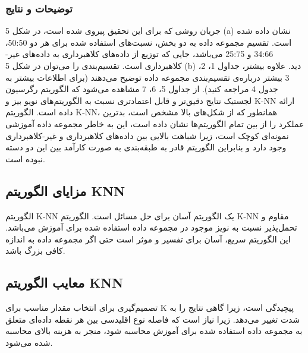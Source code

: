 \documentclass{CSICC2020}
\begin{document}
\subsubsection{توضیحات و نتایج }
جریان روشی که برای این تحقیق پیروی شده است، در شکل 5 (a) نشان داده شده است. تقسیم مجموعه داده به دو بخش، نسبت‌های استفاده شده برای هر دو 50:50، 34:66 و 25:75 می‌باشد، جایی که توزیع از داده‌های کلاهبرداری به داده‌های غیر-کلاهبرداری است. تقسیم‌بندی را می‌توان در شکل 5 (b) دید. علاوه بیشتر، جداول 1، 2، 3 بیشتر درباره‌ی تقسیم‌بندی مجموعه داده توضیح می‌دهند (برای اطلاعات بیشتر به جدول 4 مراجعه کنید). از جداول 5، 6، 7 مشاهده می‌شود که الگوریتم رگرسیون لجستیک نتایج دقیق‌تر و قابل اعتماد‌تری نسبت به الگوریتم‌های نویو بیز و K-NN ارائه داده است. الگوریتم K-NN، همانطور که از شکل‌های بالا مشخص است، بدترین عملکرد را از بین تمام الگوریتم‌ها نشان داده است، این به خاطر مجموعه داده آموزشی نمونه‌ای کوچک است، زیرا شباهت بالایی بین داده‌های کلاهبرداری و غیر-کلاهبرداری وجود دارد و بنابراین الگوریتم قادر به طبقه‌بندی به صورت کارآمد بین این دو دسته نبوده است.

\subsection{مزایای الگوریتم KNN}


 الگوریتم K-NN یک الگوریتم آسان برای حل مسائل است. 
 الگوریتم K-NN مقاوم و تحمل‌پذیر نسبت به نویز موجود در مجموعه داده استفاده شده برای آموزش می‌باشد. 
 این الگوریتم سریع، آسان برای تفسیر و موثر است حتی اگر مجموعه داده به اندازه کافی بزرگ باشد. 
\subsection{معایب الگوریتم KNN }

 تصمیم‌گیری برای انتخاب مقدار مناسب برای K پیچیدگی است، زیرا گاهی نتایج را به شدت تغییر می‌دهد. 
 زیرا نیاز است که فاصله نوع اقلیدسی بین هر نقطه داده‌ای متعلق به مجموعه داده استفاده شده برای آموزش محاسبه شود، منجر به هزینه بالای محاسبه شده می‌شود. 
\end{document}
